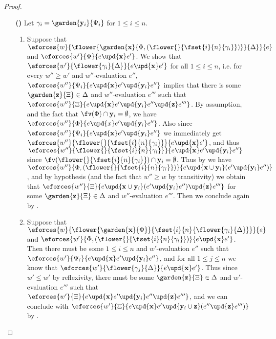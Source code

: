 \begin{scope}
\begin{proof}
\begin{itemize}
    \item[\textbf{(\rsf{srep})}]
      Let $\gamma_i = \garden{\by_i}{\Psi_i}$ for $1 \leq i \leq n$.
      \begin{enumerate}
        \item Suppose that
        $\eforces{w}{\flower{\garden{\bx}{\Phi,(\flower{}{\fset{i}{n}{\gamma_i}})}}{\Delta}}{e}$
        and $\eforces{w'}{\Phi}{e \upd{\bx} e'}$. We show that
        $\eforces{w'}{\flower{\gamma_i}{\Delta}}{e \upd{\bx} e'}$ for all $1
        \leq i \leq n$, i.e. for every $w'' \geq w'$ and $w''$-evaluation $e''$,
        $\eforces{w''}{\Psi_i}{e \upd{\bx} e' \upd{\by_i} e''}$ implies that
        there is some $\garden{\bz}{\Xi} \in \Delta$ and $w''$-evaluation $e'''$
        such that $\eforces{w''}{\Xi}{e \upd{\bx} e' \upd{\by_i} e'' \upd{\bz}
        e'''}$. By assumption,  and the fact that
        $\fv(\Phi) \cap \by_i = \emptyset$, we have $\eforces{w''}{\Phi}{e
        \upd{x} e' \upd{\by_i} e''}$. Also since $\eforces{w''}{\Psi_i}{e
        \upd{\bx} e' \upd{\by_i} e''}$ we immediately get
        $\eforces{w''}{\flower{}{\fset{i}{n}{\gamma_i}}}{e \upd{\bx} e'}$, and
        thus $\eforces{w''}{\flower{}{\fset{i}{n}{\gamma_i}}}{e \upd{\bx} e'
        \upd{\by_i} e''}$ since $\fv(\flower{}{\fset{i}{n}{\gamma_i}}) \cap
        \by_i = \emptyset$. Thus by  we have
        $\eforces{w''}{\Phi,(\flower{}{\fset{i}{n}{\gamma_i}})}{e \upd{\bx \cup
        \by_i} (e' \upd{\by_i} e'')}$, and by hypothesis (and the fact that $w''
        \geq w$ by transitivity) we obtain that $\eforces{w''}{\Xi}{e \upd{\bx
        \cup \by_i} (e' \upd{\by_i} e'') \upd{\bz} e'''}$ for some
        $\garden{\bz}{\Xi} \in \Delta$ and $w''$-evaluation $e'''$. Then we
        conclude again by .

        \item Suppose that
        $\eforces{w}{\flower{\garden{\bx}{\Phi}}{{\fset{i}{n}{\flower{\gamma_i}{\Delta}}}}}{e}$
        and $\eforces{w'}{\Phi,(\flower{}{\fset{i}{n}{\gamma_i}})}{e \upd{\bx}
        e'}$. Then there must be some $1 \leq i \leq n$ and $w'$-evaluation
        $e''$ such that $\eforces{w'}{\Psi_i}{e \upd{\bx} e' \upd{\by_i} e''}$,
        and for all $1 \leq j \leq n$ we know that
        $\eforces{w'}{\flower{\gamma_j}{\Delta}}{e \upd{\bx} e'}$. Thus since
        $w' \leq w'$ by reflexivity, there must be some $\garden{\bz}{\Xi} \in
        \Delta$ and $w'$-evaluation $e'''$ such that $\eforces{w'}{\Xi}{e
        \upd{\bx} e' \upd{\by_i} e'' \upd{\bz} e'''}$, and we can conclude with
        $\eforces{w'}{\Xi}{e \upd{\bx} e' \upd{\by_i \cup \bz} (e'' \upd{\bz}
        e''')}$ by .
      \end{enumerate} 
  \end{itemize}
\end{proof}


\end{scope}

